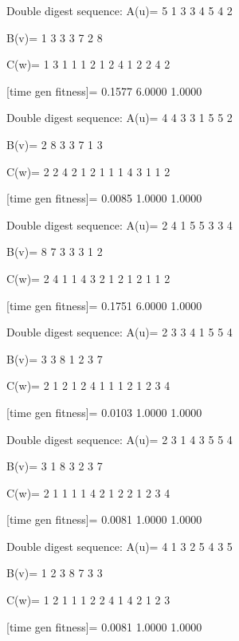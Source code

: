 Double digest sequence:
A(u)=
     5     1     3     3     4     5     4     2

B(v)=
     1     3     3     3     7     2     8

C(w)=
     1     3     1     1     1     2     1     2     4     1     2     2     4     2

[time gen fitness]=
    0.1577    6.0000    1.0000

Double digest sequence:
A(u)=
     4     4     3     3     1     5     5     2

B(v)=
     2     8     3     3     7     1     3

C(w)=
     2     2     4     2     1     2     1     1     1     4     3     1     1     2

[time gen fitness]=
    0.0085    1.0000    1.0000

Double digest sequence:
A(u)=
     2     4     1     5     5     3     3     4

B(v)=
     8     7     3     3     3     1     2

C(w)=
     2     4     1     1     4     3     2     1     2     1     2     1     1     2

[time gen fitness]=
    0.1751    6.0000    1.0000

Double digest sequence:
A(u)=
     2     3     3     4     1     5     5     4

B(v)=
     3     3     8     1     2     3     7

C(w)=
     2     1     2     1     2     4     1     1     1     2     1     2     3     4

[time gen fitness]=
    0.0103    1.0000    1.0000

Double digest sequence:
A(u)=
     2     3     1     4     3     5     5     4

B(v)=
     3     1     8     3     2     3     7

C(w)=
     2     1     1     1     1     4     2     1     2     2     1     2     3     4

[time gen fitness]=
    0.0081    1.0000    1.0000

Double digest sequence:
A(u)=
     4     1     3     2     5     4     3     5

B(v)=
     1     2     3     8     7     3     3

C(w)=
     1     2     1     1     1     2     2     4     1     4     2     1     2     3

[time gen fitness]=
    0.0081    1.0000    1.0000

